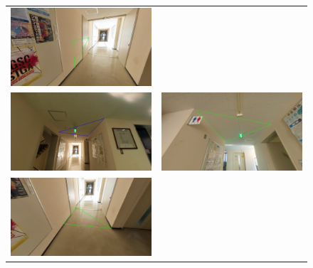 \documentclass[]{jarticle}          %
\begin{document}
\begin{figure}[H]
\begin{center}
\begin{tabular}{cc}
      \includegraphics[keepaspectratio, scale=0.08]{figures/texture012/texture_1_17.png}\\
      \includegraphics[keepaspectratio, scale=0.08]{figures/texture012/texture_0_7.png}&
      \includegraphics[keepaspectratio, scale=0.08]{figures/texture012/texture_1_10.png}\\
      \includegraphics[keepaspectratio, scale=0.08]{figures/texture012/texture_1_3.png}&

\end{tabular}
\end{center}
\end{figure}
\end{document}
